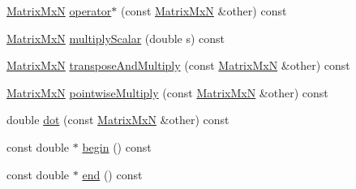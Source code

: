 \begin{DoxyCompactItemize}
\hyperlink{class_matrix_mx_n}{Matrix\-Mx\-N} \hyperlink{class_matrix_mx_n_aaa446aa7a21bec7aa7f6f83bde0780d4}{operator$\ast$} (const \hyperlink{class_matrix_mx_n}{Matrix\-Mx\-N} \&other) const 
\item 
\hyperlink{class_matrix_mx_n}{Matrix\-Mx\-N} \hyperlink{class_matrix_mx_n_a9d58289b85a96d65048916e8ac6dc1f7}{multiply\-Scalar} (double s) const 
\item 
\hyperlink{class_matrix_mx_n}{Matrix\-Mx\-N} \hyperlink{class_matrix_mx_n_ac4c1fc26a79339f7a583006f7dd99a09}{transpose\-And\-Multiply} (const \hyperlink{class_matrix_mx_n}{Matrix\-Mx\-N} \&other) const 
\item 
\hyperlink{class_matrix_mx_n}{Matrix\-Mx\-N} \hyperlink{class_matrix_mx_n_a32bc6e3104d7c7b44f6a306729c1b94b}{pointwise\-Multiply} (const \hyperlink{class_matrix_mx_n}{Matrix\-Mx\-N} \&other) const 
\item 
double \hyperlink{class_matrix_mx_n_ab064a168f8c979d5eae78ee40f5e6ff4}{dot} (const \hyperlink{class_matrix_mx_n}{Matrix\-Mx\-N} \&other) const 
\item 
const double $\ast$ \hyperlink{class_matrix_mx_n_a3f0cde8fee9f9cb556779cfc9061e7df}{begin} () const 
\item 
const double $\ast$ \hyperlink{class_matrix_mx_n_a4b843b525493e7e6ab90c3532ac3ce0e}{end} () const 
\end{DoxyCompactItemize}


